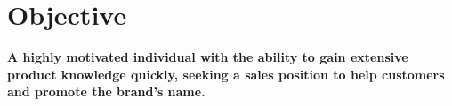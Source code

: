 \section{Objective}


\begin{center}
  \textbf{A highly motivated individual with the ability to gain extensive product knowledge quickly, seeking a sales position to help customers and promote the brand's name.}  
\end{center}